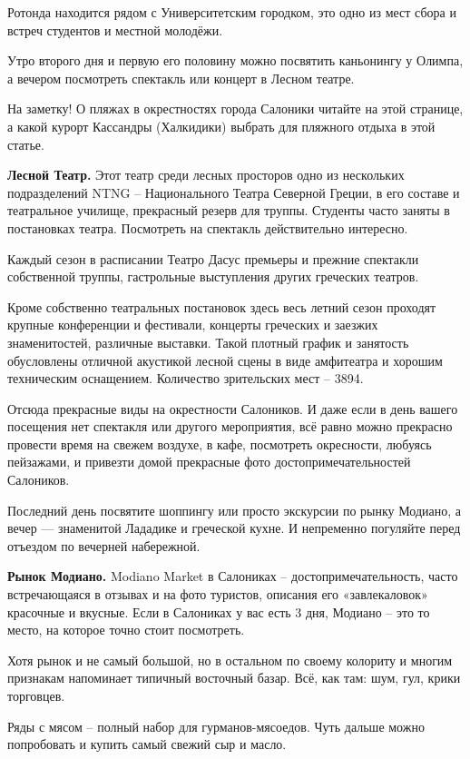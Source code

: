 Ротонда находится рядом с Университетским городком, это одно из мест сбора и встреч студентов и местной молодёжи.

Утро второго дня и первую его половину можно посвятить каньонингу у Олимпа, а вечером посмотреть спектакль или концерт в Лесном театре.

На заметку! О пляжах в окрестностях города Салоники читайте на этой странице, а какой курорт Кассандры (Халкидики) выбрать для пляжного отдыха в этой статье.

\textbf{Лесной Театр.}  Этот театр среди лесных просторов одно из нескольких подразделений NTNG – Национального Театра Северной Греции, в его составе и театральное училище, прекрасный резерв для труппы. Студенты часто заняты в постановках театра. Посмотреть на спектакль действительно интересно.

Каждый сезон в расписании Театро Дасус премьеры и прежние спектакли собственной труппы, гастрольные выступления других греческих театров.

Кроме собственно театральных постановок здесь весь летний сезон проходят крупные конференции и фестивали, концерты греческих и заезжих знаменитостей, различные выставки. Такой плотный график и занятость обусловлены отличной акустикой лесной сцены в виде амфитеатра и хорошим техническим оснащением. Количество зрительских мест – 3894.

Отсюда прекрасные виды на окрестности Салоников. И даже если в день вашего посещения нет спектакля или другого мероприятия, всё равно можно прекрасно провести время на свежем воздухе, в кафе, посмотреть окресности, любуясь пейзажами, и привезти домой прекрасные фото достопримечательностей Салоников.

Последний день посвятите шоппингу или просто экскурсии по рынку Модиано, а вечер — знаменитой Лададике и греческой кухне. И непременно погуляйте перед отъездом по вечерней набережной.

\textbf{Рынок Модиано.} Modiano Market в Салониках – достопримечательность, часто встречающаяся в отзывах и на фото туристов, описания его «завлекаловок» красочные и вкусные. Если в Салониках у вас есть 3 дня, Модиано – это то место, на которое точно стоит посмотреть.

Хотя рынок и не самый большой, но в остальном по своему колориту и многим признакам напоминает типичный восточный базар. Всё, как там: шум, гул, крики торговцев.

Ряды с мясом – полный набор для гурманов-мясоедов. Чуть дальше можно попробовать и купить самый свежий сыр и масло.

